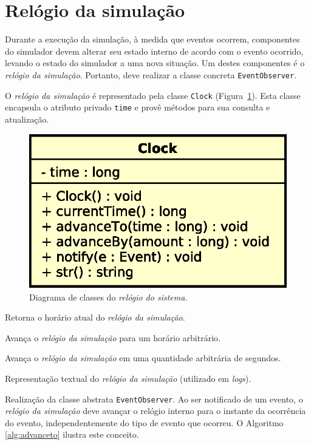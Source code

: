 \section{Relógio da simulação} Durante a execução da simulação, à medida que
eventos ocorrem, componentes do simulador devem alterar seu estado interno de
acordo com o evento ocorrido, levando o estado do simulador a uma nova situação.
Um destes componentes é o \textit{relógio da simulação}. Portanto, deve realizar
a classe concreta \texttt{EventObserver}.

O \textit{relógio da simulação} é representado pela classe \texttt{Clock}
(Figura~\ref{fig:diagram:clock}). Esta classe encapsula o atributo privado
\texttt{time} e provê métodos para sua consulta e atualização.

\begin{figure}[htb!]
  \centering
  \includegraphics[scale=0.6]{img/Clock}
  \caption{Diagrama de classes do \textit{relógio do sistema}.}
\label{fig:diagram:clock}
\end{figure}

\begin{description}[leftmargin=!,labelwidth=\widthof{\bfseries currentTime}]\setlength\itemsep{0mm}
  \item[\texttt{currentTime}] Retorna o horário atual do \textit{relógio da simulação}.
  \item[\texttt{advanceTo}] Avança o \textit{relógio da simulação} para um horário arbitrário.
  \item[\texttt{advanceBy}] Avança o \textit{relógio da simulação} em uma quantidade arbitrária de segundos.
  \item[\texttt{str}] Representação textual do \textit{relógio da simulação} (utilizado em \textit{logs}).
  \item[\texttt{notify}]
  Realização da classe abstrata \texttt{EventObserver}. Ao ser notificado de um
  evento, o \textit{relógio da simulação} deve avançar o relógio interno para o
  instante da ocorrência do evento, independentemente do tipo de evento que
  ocorreu. O Algoritmo \ref{alg:advanceto} ilustra este conceito.
\end{description}

